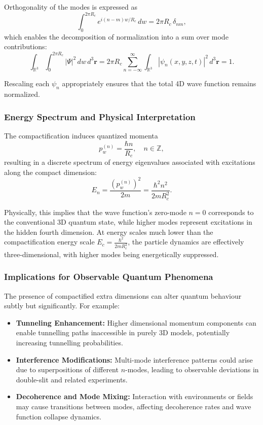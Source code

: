 \documentclass[12pt]{article}
\begin{document}
Orthogonality of the modes is expressed as
\begin{equation}
    \int_0^{2\pi R_c} e^{i (n-m) w / R_c} \, dw = 2 \pi R_c \, \delta_{nm},
\end{equation}
which enables the decomposition of normalization into a sum over mode contributions:
\begin{equation}
    \int_{\mathbb{R}^3} \int_0^{2\pi R_c} |\Psi|^2 \, dw \, d^3 \mathbf{r} = 2\pi R_c \sum_{n=-\infty}^{\infty} \int_{\mathbb{R}^3} |\psi_n(x,y,z,t)|^2 \, d^3 \mathbf{r} = 1.
\end{equation}

Rescaling each \(\psi_n\) appropriately ensures that the total 4D wave function remains normalized.

\subsubsection*{Energy Spectrum and Physical Interpretation}

The compactification induces quantized momenta
\begin{equation}
    p_w^{(n)} = \frac{\hbar n}{R_c}, \quad n \in \mathbb{Z},
\end{equation}
resulting in a discrete spectrum of energy eigenvalues associated with excitations along the compact dimension:
\begin{equation}
    E_n = \frac{(p_w^{(n)})^2}{2m} = \frac{\hbar^2 n^2}{2m R_c^2}.
\end{equation}

Physically, this implies that the wave function's zero-mode \( n=0 \) corresponds to the conventional 3D quantum state, while higher modes represent excitations in the hidden fourth dimension. At energy scales much lower than the compactification energy scale \( E_c = \frac{\hbar^2}{2m R_c^2} \), the particle dynamics are effectively three-dimensional, with higher modes being energetically suppressed.

\subsubsection*{Implications for Observable Quantum Phenomena}

The presence of compactified extra dimensions can alter quantum behaviour subtly but significantly. For example:

\begin{itemize}
    \item \textbf{Tunneling Enhancement:} Higher dimensional momentum components can enable tunnelling paths inaccessible in purely 3D models, potentially increasing tunnelling probabilities.
    \item \textbf{Interference Modifications:} Multi-mode interference patterns could arise due to superpositions of different \( n \)-modes, leading to observable deviations in double-slit and related experiments.
    \item \textbf{Decoherence and Mode Mixing:} Interaction with environments or fields may cause transitions between modes, affecting decoherence rates and wave function collapse dynamics.
\end{itemize}
\end{document}
